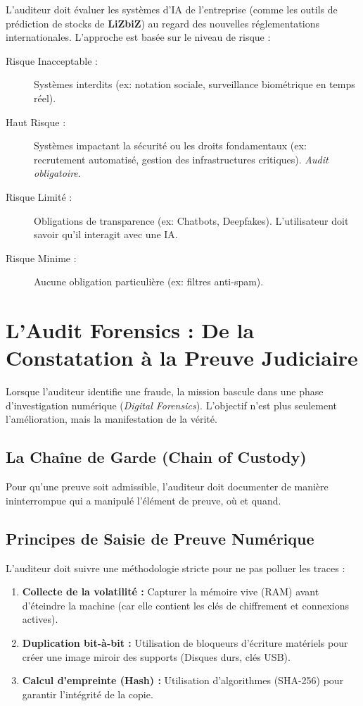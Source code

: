 L'auditeur doit évaluer les systèmes d'IA de l'entreprise (comme les outils de prédiction de stocks de \textbf{LiZbiZ}) au regard des nouvelles réglementations internationales. L'approche est basée sur le niveau de risque :

\begin{description}
    \item[Risque Inacceptable :] Systèmes interdits (ex: notation sociale, surveillance biométrique en temps réel).
    \item[Haut Risque :] Systèmes impactant la sécurité ou les droits fondamentaux (ex: recrutement automatisé, gestion des infrastructures critiques). \textit{Audit obligatoire}.
    \item[Risque Limité :] Obligations de transparence (ex: Chatbots, Deepfakes). L'utilisateur doit savoir qu'il interagit avec une IA.
    \item[Risque Minime :] Aucune obligation particulière (ex: filtres anti-spam).
\end{description}
\section{L'Audit Forensics : De la Constatation à la Preuve Judiciaire}

Lorsque l'auditeur identifie une fraude, la mission bascule dans une phase d'investigation numérique (\textit{Digital Forensics}). L'objectif n'est plus seulement l'amélioration, mais la manifestation de la vérité.

\subsection{La Chaîne de Garde (Chain of Custody)}
Pour qu'une preuve soit admissible, l'auditeur doit documenter de manière ininterrompue qui a manipulé l'élément de preuve, où et quand.

\subsection{Principes de Saisie de Preuve Numérique}
L'auditeur doit suivre une méthodologie stricte pour ne pas polluer les traces :
\begin{enumerate}
    \item \textbf{Collecte de la volatilité :} Capturer la mémoire vive (RAM) avant d'éteindre la machine (car elle contient les clés de chiffrement et connexions actives).
    \item \textbf{Duplication bit-à-bit :} Utilisation de bloqueurs d'écriture matériels pour créer une image miroir des supports (Disques durs, clés USB).
    \item \textbf{Calcul d'empreinte (Hash) :} Utilisation d'algorithmes (SHA-256) pour garantir l'intégrité de la copie.
\end{enumerate}

